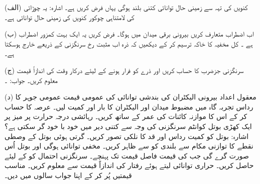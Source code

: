 (الف) کنویں کی تہہ سے زمینی حال توانائی کتنی بلند ہوگی یہاں فرض کریں  ہے۔ اشارہ: یہ  چوڑائی کی لامتناہی چوکور کنویں کی زمینی حال توانائی ہے۔

(ب) اب اضطراب  متعارف کریں بیرونی برقی میدان  میں  ہوگا۔ فرض کریں یہ ایک بہت کمزور اضطراب ہے ۔ کل مخفیہ کا خاکہ ترسیم کر کے دیکھیں کہ ذرہ اب مثبت  رخ سرنگزنی کے ذریعے خارج ہوسکتا ہے۔

(ج) سرنگزنی جزضرب   کا حساب کریں اور ذرے کو فرار ہونے کے لیئے درکار وقت کی اندازاً قیمت  معلوم کریں۔ جواب: ۔

(د) معقول اعداد  بیرونی الیکٹران کی بندشی توانائی کی عمومی قیمت  عمومی جوہر کا رداس  تجربہ گاہ میں مضبوط میدان  اور  الیکٹران کا بار اور کمیت لیں۔ عرصہ  کا حساب کر کے اس کا موازنہ کائنات کی عمر کے ساتھ کریں۔
رہائشی درجہ حرارت پر میز پر ایک کھڑی بوتل کوانٹم سرنگزنی کی وجہ سے کتنی دیر میں خود با خود گر سکتی ہے؟ اشارہ: بوتل کو کمیت  رداس  اور قد  کا نلکی تصور کریں۔ گرتی ہوئی بوتل کے وصطی نقطے کا توازنی مکام  سے بلندی کو  سے ظاہر کریں۔ مخفی توانائی  ہوگی اور بوتل اُس صورت گرے گی جب  کی قیمت فاصل قیمت  تک پہنچے۔ سرنگزنی احتمال  کو  کے لیئے حاصل کریں۔ حراری توانائی  لیتے ہوئے رفتار کی اندازاً 	قیمت  سے معلوم کریں۔ مناسب قیمتیں پُر کر کے اپنا جواب سالوں میں دیں۔

